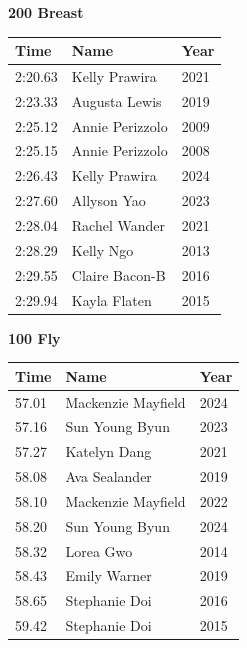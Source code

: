 \vspace{1.2em}
\noindent\begin{minipage}[t]{0.48\textwidth}
\centering
\textbf{\textcolor{teamprimary}{200 Breast}}\par
\vspace{0.5em}
\centering
\small
\renewcommand{\arraystretch}{1.0}
\setlength{\tabcolsep}{4pt}
\begin{tabular}{@{}p{1.8cm}p{3.0cm}p{1.0cm}@{}}
\toprule
\textbf{Time} & \textbf{Name} & \textbf{Year} \\
\midrule
2:20.63 & Kelly Prawira & 2021 \\
2:23.33 & Augusta Lewis & 2019 \\
2:25.12 & Annie Perizzolo & 2009 \\
2:25.15 & Annie Perizzolo & 2008 \\
2:26.43 & Kelly Prawira & 2024 \\
2:27.60 & Allyson Yao & 2023 \\
2:28.04 & Rachel Wander & 2021 \\
2:28.29 & Kelly Ngo & 2013 \\
2:29.55 & Claire Bacon-B & 2016 \\
2:29.94 & Kayla Flaten & 2015 \\
\bottomrule
\end{tabular}
\end{minipage}
\hfill
\begin{minipage}[t]{0.48\textwidth}
\centering
\textbf{\textcolor{teamprimary}{100 Fly}}\par
\vspace{0.5em}
\centering
\small
\renewcommand{\arraystretch}{1.0}
\setlength{\tabcolsep}{4pt}
\begin{tabular}{@{}p{1.8cm}p{3.0cm}p{1.0cm}@{}}
\toprule
\textbf{Time} & \textbf{Name} & \textbf{Year} \\
\midrule
57.01 & Mackenzie Mayfield & 2024 \\
57.16 & Sun Young Byun & 2023 \\
57.27 & Katelyn Dang & 2021 \\
58.08 & Ava Sealander & 2019 \\
58.10 & Mackenzie Mayfield & 2022 \\
58.20 & Sun Young Byun & 2024 \\
58.32 & Lorea Gwo & 2014 \\
58.43 & Emily Warner & 2019 \\
58.65 & Stephanie Doi & 2016 \\
59.42 & Stephanie Doi & 2015 \\
\bottomrule
\end{tabular}
\end{minipage}

